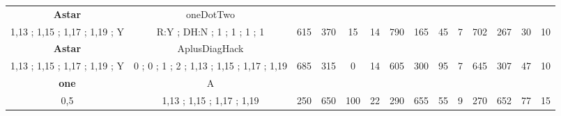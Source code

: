 \begin{table}[H]
{\begin{tabular}{|c|c|c|c|c|c|c|c|c|c|c|c|c|c|}
\cellcolor{blue!15}\textbf{Astar} & oneDotTwo& {\color[HTML]{00009B} } & {\color[HTML]{9A0000} } & {\color[HTML]{009901} } &  & {\color[HTML]{00009B} } & {\color[HTML]{9A0000} } & {\color[HTML]{009901} } &  & {\color[HTML]{00009B} } & {\color[HTML]{9A0000} } & {\color[HTML]{009901} } &  \\ 
\cellcolor{ blue!15}1,13 ; 1,15 ; 1,17 ; 1,19 ; Y & R:Y ; DH:N ; 1 ; 1 ; 1 ; 1 & \multirow{-2}{*}{{\color[HTML]{00009B} 615}} & \multirow{-2}{*}{{\color[HTML]{9A0000} 370}} & \multirow{-2}{*}{{\color[HTML]{009901} 15}} & \multirow{-2}{*}{14} & \multirow{-2}{*}{{\color[HTML]{00009B} 790}} & \multirow{-2}{*}{{\color[HTML]{9A0000} 165}} & \multirow{-2}{*}{{\color[HTML]{009901} 45}} & \multirow{-2}{*}{7} & \multirow{-2}{*}{{\color[HTML]{00009B} 702}} & \multirow{-2}{*}{{\color[HTML]{9A0000} 267}} & \multirow{-2}{*}{{\color[HTML]{009901} 30}} & \multirow{-2}{*}{10} \\ \hline

\cellcolor{blue!15}\textbf{Astar} & AplusDiagHack& {\color[HTML]{00009B} } & {\color[HTML]{9A0000} } & {\color[HTML]{009901} } &  & {\color[HTML]{00009B} } & {\color[HTML]{9A0000} } & {\color[HTML]{009901} } &  & {\color[HTML]{00009B} } & {\color[HTML]{9A0000} } & {\color[HTML]{009901} } &  \\ 
\cellcolor{ blue!15}1,13 ; 1,15 ; 1,17 ; 1,19 ; Y & 0 ; 0 ; 1 ; 2 ; 1,13 ; 1,15 ; 1,17 ; 1,19 & \multirow{-2}{*}{{\color[HTML]{00009B} 685}} & \multirow{-2}{*}{{\color[HTML]{9A0000} 315}} & \multirow{-2}{*}{{\color[HTML]{009901} 0}} & \multirow{-2}{*}{14} & \multirow{-2}{*}{{\color[HTML]{00009B} 605}} & \multirow{-2}{*}{{\color[HTML]{9A0000} 300}} & \multirow{-2}{*}{{\color[HTML]{009901} 95}} & \multirow{-2}{*}{7} & \multirow{-2}{*}{{\color[HTML]{00009B} 645}} & \multirow{-2}{*}{{\color[HTML]{9A0000} 307}} & \multirow{-2}{*}{{\color[HTML]{009901} 47}} & \multirow{-2}{*}{10} \\ \hline

\cellcolor{blue!15}\textbf{one} & A& {\color[HTML]{00009B} } & {\color[HTML]{9A0000} } & {\color[HTML]{009901} } &  & {\color[HTML]{00009B} } & {\color[HTML]{9A0000} } & {\color[HTML]{009901} } &  & {\color[HTML]{00009B} } & {\color[HTML]{9A0000} } & {\color[HTML]{009901} } &  \\ 
\cellcolor{ blue!15}0,5 & 1,13 ; 1,15 ; 1,17 ; 1,19 & \multirow{-2}{*}{{\color[HTML]{00009B} 250}} & \multirow{-2}{*}{{\color[HTML]{9A0000} 650}} & \multirow{-2}{*}{{\color[HTML]{009901} 100}} & \multirow{-2}{*}{22} & \multirow{-2}{*}{{\color[HTML]{00009B} 290}} & \multirow{-2}{*}{{\color[HTML]{9A0000} 655}} & \multirow{-2}{*}{{\color[HTML]{009901} 55}} & \multirow{-2}{*}{9} & \multirow{-2}{*}{{\color[HTML]{00009B} 270}} & \multirow{-2}{*}{{\color[HTML]{9A0000} 652}} & \multirow{-2}{*}{{\color[HTML]{009901} 77}} & \multirow{-2}{*}{15} \\ \hline


\end{tabular}}
\end{table}
